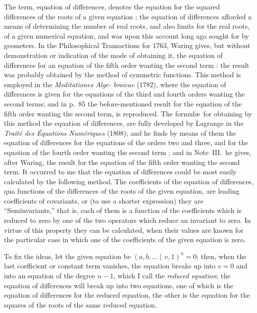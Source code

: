 \documentclass[12pt,a4paper]{article}
\theoremstyle{plain}
\begin{document}
The  term,  equation  of  differences,  denotes  the  equation  for  the  squared  differences
of  the  roots  of  a  given  equation ;  the  equation  of  differences  afforded  a  means  of
determining  the  number  of  real  roots,  and  also  limits  for  the  real  roots,  of  a  given
numerical  equation,  and  was  upon  this  account  long  ago  sought  for  by  geometers.
In  the  Philosophical  Transactions  for  1763,  Waring  gives,  but  without  demonstration
or  indication  of  the  mode  of  obtaining  it,  the  equation  of  differences  for  an  equation
of  the  fifth  order  wanting  the  second  term :  the  result  was  probably  obtained  by  the
method  of  symmetric  functions.  This  method  is  employed  in  the  \textit{Meditationes  Alge-}
\textit{braicae}  (1782),  where  the  equation  of  differences  is  given  for  the  equations  of  the
third  and  fourth  orders  wanting  the  second  terms;  and  in  p.~85  the  before-mentioned
result  for  the  equation  of  the  fifth  order  wanting  the  second  term,  is  reproduced.
The  formul\ae\  for  obtaining  by  this  method  the  equation  of  differences,  are  fully
developed  by  Lagrange  in  the  \textit{Trait\'e  des  \'Equations  Num\'eriques}  (1808);  and  he  finds
by  means  of  them  the  equation  of  differences  for  the  equations  of  the  orders  two  and
three,  and  for  the  equation  of  the  fourth  order  wanting  the  second  term ;  and  in
Note~III.\  he  gives,  after  Waring,  the  result  for  the  equation  of  the  fifth  order  wanting
the  second  term.  It  occurred  to  me  that  the  equation  of  differences  could  be  most
easily  calculated  by  the  following  method.  The  coefficients  of  the  equation  of  differences,
qua    functions    of    the    differences    of    the    roots    of    the    given  equation,   are    leading
coefficients  of  covariants,  or  (to  use  a  shorter  expression)  they  are  ``Seminvariants,''
that  is,  each  of  them  is  a  function  of  the  coefficients  which  is  reduced  to  zero  by  one
of  the  two  operators  which  reduce  an  invariant  to  zero.  In  virtue  of  this  property
they  can  be  calculated,  when  their  values  are  known  for  the  particular  case  in  which
one  of  the  coefficients  of  the  given  equation  is  zero.

To  fix  the  ideas,  let  the  given  equation  be  $(a, b, \ldots \mid\, v,  1)^n = 0$;  then,  when  the
last  coefficient  or  constant  term  vanishes,  the  equation  breaks  up  into  $v = 0$  and  into
an  equation  of  the  degree  $n-1$,  which  I  call  the  \textit{reduced  equation};  the  equation  of
differences  will  break  up  into  two  equations,  one  of  which  is  the  equation  of  differences
for  the  reduced  equation,  the  other  is  the  equation  for  the  squares  of  the  roots  of  the
same  reduced  equation.
\end{document}
